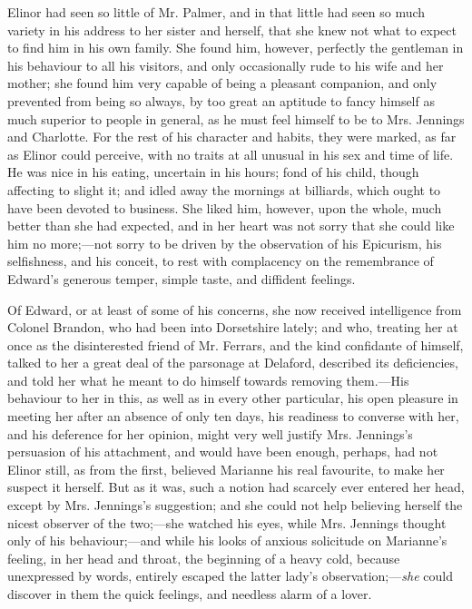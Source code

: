 Elinor had seen so little of Mr. Palmer, and in that little had seen so much variety in his address to her sister and herself, that she knew not what to expect to find him in his own family. She found him, however, perfectly the gentleman in his behaviour to all his visitors, and only occasionally rude to his wife and her mother; she found him very capable of being a pleasant companion, and only prevented from being so always, by too great an aptitude to fancy himself as much superior to people in general, as he must feel himself to be to Mrs. Jennings and Charlotte. For the rest of his character and habits, they were marked, as far as Elinor could perceive, with no traits at all unusual in his sex and time of life. He was nice in his eating, uncertain in his hours; fond of his child, though affecting to slight it; and idled away the mornings at billiards, which ought to have been devoted to business. She liked him, however, upon the whole, much better than she had expected, and in her heart was not sorry that she could like him no more;---not sorry to be driven by the observation of his Epicurism, his selfishness, and his conceit, to rest with complacency on the remembrance of Edward's generous temper, simple taste, and diffident feelings.

Of Edward, or at least of some of his concerns, she now received intelligence from Colonel Brandon, who had been into Dorsetshire lately; and who, treating her at once as the disinterested friend of Mr. Ferrars, and the kind confidante of himself, talked to her a great deal of the parsonage at Delaford, described its deficiencies, and told her what he meant to do himself towards removing them.---His behaviour to her in this, as well as in every other particular, his open pleasure in meeting her after an absence of only ten days, his readiness to converse with her, and his deference for her opinion, might very well justify Mrs. Jennings's persuasion of his attachment, and would have been enough, perhaps, had not Elinor still, as from the first, believed Marianne his real favourite, to make her suspect it herself. But as it was, such a notion had scarcely ever entered her head, except by Mrs. Jennings's suggestion; and she could not help believing herself the nicest observer of the two;---she watched his eyes, while Mrs. Jennings thought only of his behaviour;---and while his looks of anxious solicitude on Marianne's feeling, in her head and throat, the beginning of a heavy cold, because unexpressed by words, entirely escaped the latter lady's observation;---{\em she} could discover in them the quick feelings, and needless alarm of a lover.


